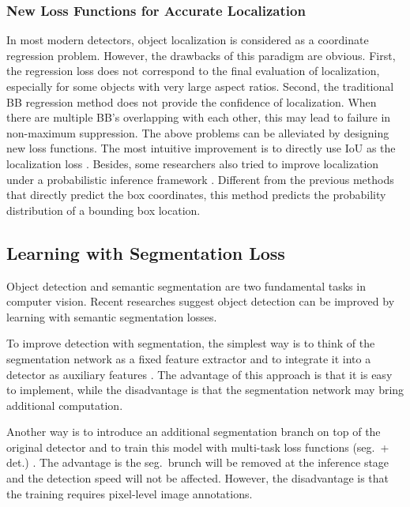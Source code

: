 \documentclass[lettersize,journal]{IEEEtran}
\begin{document}
\subsubsection{New Loss Functions for Accurate Localization}

In most modern detectors, object localization is considered as a coordinate regression problem. However, the drawbacks of this paradigm are obvious. First, the regression loss does not correspond to the final evaluation of localization, especially for some objects with very large aspect ratios. Second, the traditional BB regression method does not provide the confidence of localization. When there are multiple BB's overlapping with each other, this may lead to failure in non-maximum suppression. The above problems can be alleviated by designing new loss functions. The most intuitive improvement is to directly use IoU as the localization loss \cite{ACMMM16-UnitBox, CVPR18-AcqLocConf,rezatofighi2019generalized,zheng2020distance}. Besides, some researchers also tried to improve localization under a probabilistic inference framework \cite{CVPR16-LocNet}. Different from the previous methods that directly predict the box coordinates, this method predicts the probability distribution of a bounding box location.

\subsection{Learning with Segmentation Loss}\label{subsec:learning_seg}

Object detection and semantic segmentation are two fundamental tasks in computer vision. Recent researches suggest object detection can be improved by learning with semantic segmentation losses.


To improve detection with segmentation, the simplest way is to think of the segmentation network as a fixed feature extractor and to integrate it into a detector as auxiliary features \cite{CVPR15-MultiRegion, WACV17-StuffNet, ECCV16-ContexPrimFaster}. The advantage of this approach is that it is easy to implement, while the disadvantage is that the segmentation network may bring additional computation. 

Another way is to introduce an additional segmentation branch on top of the original detector and to train this model with multi-task loss functions (seg.\ + det.) \cite{WACV17-StuffNet,ICCV17-MaskRCNN,chen2019hybrid}. The advantage is the seg.\ brunch will be removed at the inference stage and the detection speed will not be affected. However, the disadvantage is that the training requires pixel-level image annotations. 
\end{document}
